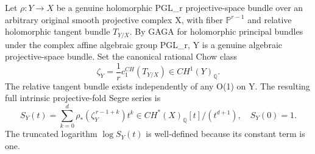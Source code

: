 \documentclass[11pt]{article}
\begin{document}
Let $\rho:Y\to X$ be a genuine
holomorphic PGL_r projective-space
bundle over an arbitrary original
smooth projective complex X, with
fiber $\mathbb P^{r-1}$ and
relative holomorphic tangent
bundle $T_{Y/X}$. By GAGA for
holomorphic principal bundles
under the complex affine algebraic
group PGL_r, Y is a genuine
algebraic projective-space bundle.
Set the canonical rational Chow
class
\[
 \boxed{
 \zeta_Y=\frac1r c_1^{CH}
              (T_{Y/X})\in CH^1(Y)_\mathbb Q.
 }                                                       \tag{12}
\]
The relative tangent bundle exists
independently of any O(1) on Y.
The resulting full intrinsic
projective-fold Segre series is
\[
 \boxed{
 S_Y(t)=\sum_{k=0}^{d}
       \rho_*\left(\zeta_Y^{\,r-1+k}\right)t^k
       \in CH^*(X)_\mathbb Q[t]/(t^{d+1}),
 \quad S_Y(0)=1 .
 }                                                       \tag{13}
\]
The truncated logarithm $\log S_Y(t)$
is well-defined because its
constant term is one.
\end{document}

